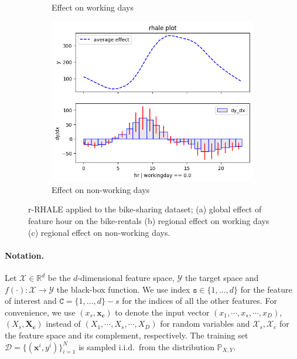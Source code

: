 \documentclass[
twocolumn,
]{ceurart}
\newcommand{\xb}{\mathbf{x}}
\newcommand{\xc}{\mathbf{x_c}}
\newcommand{\Xc}{\mathbf{X_c}}
\begin{document}
\begin{figure}
\begin{subfigure}[t]{0.32\textwidth}
  \caption{Effect on working days}
  \label{subfig:regional_a}
  \end{subfigure}
  \begin{subfigure}[t]{0.32\textwidth}
  \centering  
  \includegraphics[width=\linewidth]{figures/running_example/01_bike_sharing_dataset_29_0.png}
  \caption{Effect on non-working days}
  \label{subfig:regional_b}
  \end{subfigure}
  \caption{r-RHALE applied to the bike-sharing dataset; (a) global effect of feature hour on the bike-rentals (b) regional effect on working days (c) regional effect on non-working days.}
  \label{fig:main-concept}
\end{figure}

\paragraph{Notation.}

Let \(\mathcal{X} \in \mathbb{R}^d\) be the \(d\)-dimensional feature space, \(\mathcal{Y}\) the target space and
\(f(\cdot) : \mathcal{X} \rightarrow \mathcal{Y}\) the black-box function.
We use index \(\mathtt{s} \in \{1, \ldots, d\}\) for the feature of interest and \(\mathtt{C} = \{1, \ldots, d\} - s\) for the indices of all the other features.
For convenience, we use \((x_s, \xc)\) to denote the input vector \((x_1, \cdots , x_s, \cdots, x_D)\),
\((X_s, \Xc)\) instead of \((X_1, \cdots , X_s, \cdots, X_D)\) for random variables and
$\mathcal{X}_s, \mathcal{X}_{c}$ for the feature space and its complement, respectively.
The training set \(\mathcal{D} = \{(\xb^i, y^i)\}_{i=1}^N\) is sampled
i.i.d.\ from the distribution \(\mathbb{P}_{X,Y}\).
\end{document}
